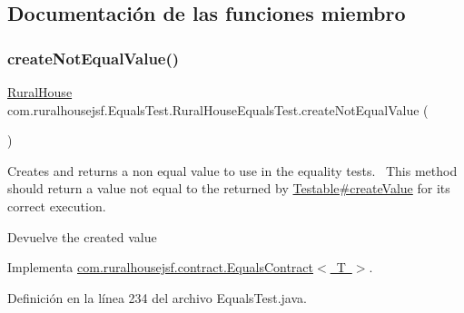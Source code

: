 \subsection{Documentación de las funciones miembro}
\mbox{\label{classcom_1_1ruralhousejsf_1_1_equals_test_1_1_rural_house_equals_test_a4021dc1a2dacaed55fa5bacec7ca6165}} 
\subsubsection{\texorpdfstring{createNotEqualValue()}{createNotEqualValue()}}
{\footnotesize\ttfamily \mbox{\hyperlink{classcom_1_1ruralhousejsf_1_1domain_1_1_rural_house}{Rural\+House}} com.\+ruralhousejsf.\+Equals\+Test.\+Rural\+House\+Equals\+Test.\+create\+Not\+Equal\+Value (\begin{DoxyParamCaption}{ }\end{DoxyParamCaption})}

Creates and returns a non equal value to use in the equality tests.~\newline
 This method should return a value not equal to the returned by \mbox{\hyperlink{}{Testable\#create\+Value}} for its correct execution.

\begin{DoxyReturn}{Devuelve}
the created value 
\end{DoxyReturn}


Implementa \mbox{\hyperlink{interfacecom_1_1ruralhousejsf_1_1contract_1_1_equals_contract_a65840509b57f6b89e42e2abf1978aa01}{com.\+ruralhousejsf.\+contract.\+Equals\+Contract$<$ T $>$}}.



Definición en la línea 234 del archivo Equals\+Test.\+java.

\mbox{\label{classcom_1_1ruralhousejsf_1_1_equals_test_1_1_rural_house_equals_test_abcab55b3e63c8d5511f04e395ff0f111}} 
